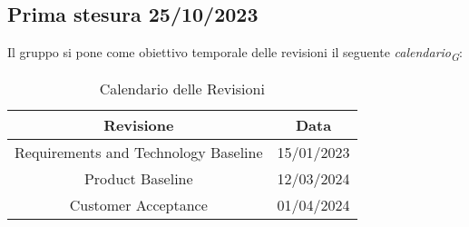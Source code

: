 \subsection{Prima stesura 25/10/2023}
Il gruppo si pone come obiettivo temporale delle revisioni il seguente \textit{calendario}\textsubscript{\textit{G}}:
\begin{table}[ht]
    \centering
    \begin{tabular}{|c|c|}
        \hline
        \textbf{Revisione} & \textbf{Data} \\
        \hline
        Requirements and Technology Baseline & 15/01/2023 \\
        Product Baseline  & 12/03/2024 \\
        Customer Acceptance & 01/04/2024 \\
        \hline
    \end{tabular}
    \caption{Calendario delle Revisioni}
\end{table}
